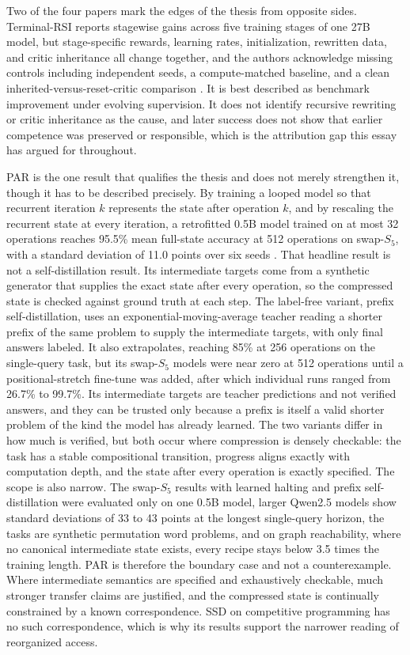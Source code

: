 \documentclass[11pt]{article}
\begin{document}
Two of the four papers mark the edges of the thesis from opposite sides.
Terminal-RSI reports stagewise gains across five training stages of one
27B model, but stage-specific rewards, learning rates, initialization,
rewritten data, and critic inheritance all change together, and the authors
acknowledge missing controls including independent seeds, a compute-matched
baseline, and a clean inherited-versus-reset-critic comparison
\cite{yang2026terminalrsi}. It is best described as benchmark improvement
under evolving supervision. It does not identify recursive rewriting or
critic inheritance as the cause, and later success does not show that
earlier competence was preserved or responsible, which is the attribution
gap this essay has argued for throughout.

PAR is the one result that qualifies the thesis and does not merely strengthen it, though it has to be described precisely. By training a looped model so that recurrent iteration $k$ represents the state after operation $k$, and by rescaling the recurrent state at every iteration, a retrofitted 0.5B model trained on at most 32 operations reaches 95.5\% mean full-state accuracy at 512 operations on swap-$S_5$, with a standard deviation of 11.0 points over six seeds \cite{wang2026par}. That headline result is not a self-distillation result. Its intermediate targets come from a synthetic generator that supplies the exact state after every operation, so the compressed state is checked against ground truth at each step. The label-free variant, prefix self-distillation, uses an exponential-moving-average teacher reading a shorter prefix of the same problem to supply the intermediate targets, with only final answers labeled. It also extrapolates, reaching 85\% at 256 operations on the single-query task, but its swap-$S_5$ models were near zero at 512 operations until a positional-stretch fine-tune was added, after which individual runs ranged from 26.7\% to 99.7\%. Its intermediate targets are teacher predictions and not verified answers, and they can be trusted only because a prefix is itself a valid shorter problem of the kind the model has already learned. The two variants differ in how much is verified, but both occur where compression is densely checkable: the task has a stable compositional transition, progress aligns exactly with computation depth, and the state after every operation is exactly specified. The scope is also narrow. The swap-$S_5$ results with learned halting and prefix self-distillation were evaluated only on one 0.5B model, larger Qwen2.5 models show standard deviations of 33 to 43 points at the longest single-query horizon, the tasks are synthetic permutation word problems, and on graph reachability, where no canonical intermediate state exists, every recipe stays below 3.5 times the training length. PAR is therefore the boundary case and not a counterexample. Where intermediate semantics are specified and exhaustively checkable, much stronger transfer claims are justified, and the compressed state is continually constrained by a known correspondence. SSD on competitive programming has no such correspondence, which is why its results support the narrower reading of reorganized access.
\end{document}
